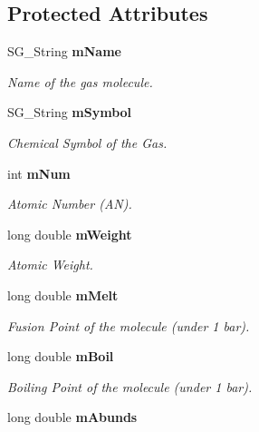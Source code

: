 \subsection*{Protected Attributes}
\begin{CompactItemize}
\item 
SG\_\-String {\bf m\-Name}\label{class_s_g___gas_p0}

\begin{CompactList}\small\item\em Name of the gas molecule. \item\end{CompactList}\item 
SG\_\-String {\bf m\-Symbol}\label{class_s_g___gas_p1}

\begin{CompactList}\small\item\em Chemical Symbol of the Gas. \item\end{CompactList}\item 
int {\bf m\-Num}\label{class_s_g___gas_p2}

\begin{CompactList}\small\item\em Atomic Number (AN). \item\end{CompactList}\item 
long double {\bf m\-Weight}\label{class_s_g___gas_p3}

\begin{CompactList}\small\item\em Atomic Weight. \item\end{CompactList}\item 
long double {\bf m\-Melt}\label{class_s_g___gas_p4}

\begin{CompactList}\small\item\em Fusion Point of the molecule (under 1 bar). \item\end{CompactList}\item 
long double {\bf m\-Boil}\label{class_s_g___gas_p5}

\begin{CompactList}\small\item\em Boiling Point of the molecule (under 1 bar). \item\end{CompactList}\item 
long double {\bf m\-Abunds}\label{class_s_g___gas_p6}


\end{CompactItemize}
